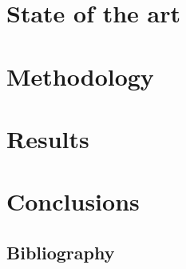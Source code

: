 \documentclass[oneside, 12pt, a4paper]{book}
\begin{document}
\mainmatter%








\part{State of the art}






\part{Methodology}





\part{Results}

\part{Conclusions}






\blankpage%
\chapter*{Bibliography}
\printbibliography%
%
\end{document}
